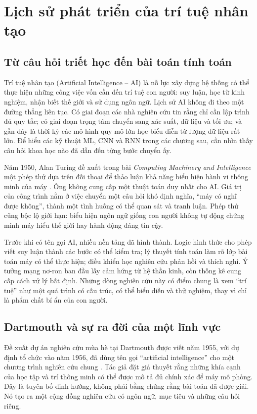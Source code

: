 \documentclass[12pt,a4paper]{report}
\begin{document}
\chapter{Lịch sử phát triển của trí tuệ nhân tạo}\label{ch:history}
\section{Từ câu hỏi triết học đến bài toán tính toán}
Trí tuệ nhân tạo (Artificial Intelligence -- AI) là nỗ lực xây dựng hệ thống có thể thực hiện những công việc vốn cần đến trí tuệ con người: suy luận, học từ kinh nghiệm, nhận biết thế giới và sử dụng ngôn ngữ. Lịch sử AI không đi theo một đường thẳng liên tục. Có giai đoạn các nhà nghiên cứu tin rằng chỉ cần lập trình đủ quy tắc; có giai đoạn trọng tâm chuyển sang xác suất, dữ liệu và tối ưu; và gần đây là thời kỳ các mô hình quy mô lớn học biểu diễn từ lượng dữ liệu rất lớn. Để hiểu các kỹ thuật ML, CNN và RNN trong các chương sau, cần nhìn thấy câu hỏi khoa học nào đã dẫn đến từng bước chuyển ấy.

Năm 1950, Alan Turing đề xuất trong bài \textit{Computing Machinery and Intelligence} một phép thử dựa trên đối thoại để thảo luận khả năng biểu hiện hành vi thông minh của máy \cite{turing1950}. Ông không cung cấp một thuật toán duy nhất cho AI. Giá trị của công trình nằm ở việc chuyển một câu hỏi khó định nghĩa, ``máy có nghĩ được không'', thành một tình huống có thể quan sát và tranh luận. Phép thử cũng bộc lộ giới hạn: biểu hiện ngôn ngữ giống con người không tự động chứng minh máy hiểu thế giới hay hành động đáng tin cậy.

Trước khi có tên gọi AI, nhiều nền tảng đã hình thành. Logic hình thức cho phép viết suy luận thành các bước có thể kiểm tra; lý thuyết tính toán làm rõ lớp bài toán máy có thể thực hiện; điều khiển học nghiên cứu phản hồi và thích nghi. Ý tưởng mạng nơ-ron ban đầu lấy cảm hứng từ hệ thần kinh, còn thống kê cung cấp cách xử lý bất định. Những dòng nghiên cứu này có điểm chung là xem ``trí tuệ'' như một quá trình có cấu trúc, có thể biểu diễn và thử nghiệm, thay vì chỉ là phẩm chất bí ẩn của con người.

\section{Dartmouth và sự ra đời của một lĩnh vực}
Đề xuất dự án nghiên cứu mùa hè tại Dartmouth được viết năm 1955, với dự định tổ chức vào năm 1956, đã dùng tên gọi ``artificial intelligence'' cho một chương trình nghiên cứu chung \cite{dartmouth1955}. Tác giả đặt giả thuyết rằng những khía cạnh của học tập và trí thông minh có thể được mô tả đủ chính xác để máy mô phỏng. Đây là tuyên bố định hướng, không phải bằng chứng rằng bài toán đã được giải. Nó tạo ra một cộng đồng nghiên cứu có ngôn ngữ, mục tiêu và những câu hỏi riêng.
\end{document}
